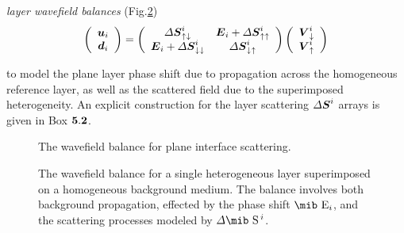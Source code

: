 \begin{enumerate}
\begin{samepage}
\item {\em layer wavefield balances\/} (Fig.\ref{LayerScat})
\begin{equation} \label{Lbalance}
\left({\begin{array}{c}{\mbox{\boldmath$\mit u$\unboldmath}}_{i}\\
{\mbox{\boldmath$\mit d$\unboldmath}}_{i}\end{array}}\right)=\left({\begin{array}{cc}
{{\mit \Delta} \mbox{\boldmath$\mit S$\unboldmath}}_{ \uparrow \downarrow}^{i}&{\mbox{\boldmath$\mit E$\unboldmath}}_{i}+{{\mit \Delta} \mbox{\boldmath$\mit S$\unboldmath}}_{ \uparrow
\uparrow }^{i}\\ 
{\mbox{\boldmath$\mit E$\unboldmath}}_{i}+{{\mit \Delta} \mbox{\boldmath$\mit S$\unboldmath}}_{ \downarrow\downarrow }^{i}&{{\mit \Delta} \mbox{\boldmath$\mit S$\unboldmath}}_{
\downarrow\uparrow}^{i}
\end{array}}\right)
\left({\begin{array}{c}{\mbox{\boldmath$\mit V$\unboldmath}}_{ \downarrow }^{i}\\
{\mbox{\boldmath$\mit V$\unboldmath}}_{ \uparrow }^{i}\end{array}}\right)
\end{equation}
\end{samepage}
to model the plane layer phase shift due to propagation across the 
homogeneous reference layer, as well as the scattered field due to the 
superimposed heterogeneity.
An explicit 
construction for the layer scattering  
${{\mit \Delta} \mbox{\boldmath$\mit S$\unboldmath}}^{i}$ arrays is given in 
{\sc   Box} ${\bf  5.2}$.

\end{enumerate}

\begin{figure}
\HideDisplacementBoxes
\centerline{}
\caption{The wavefield balance for plane interface scattering.}
\protect\label{IntScat}
\end{figure}
\begin{figure}
\HideDisplacementBoxes
\centerline{}
\caption{The wavefield balance for a single heterogeneous layer superimposed on a homogeneous
background medium. The balance involves both background propagation, 
effected by the phase shift $\mbox{\mib  E}{}_{i}$, and the scattering processes 
modeled by ${\mit \Delta}\mbox{\mib S}\,{}^{i}$. }
\protect\label{LayerScat}
\end{figure}

